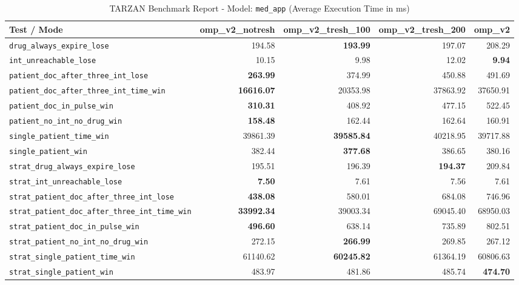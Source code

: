 \begin{table}[htbp]
\centering
\caption{TARZAN Benchmark Report - Model: \texttt{med\_app} (Average Execution Time in ms)}
\label{tab:med_app_benchmark}
\begin{tabular}{lrrrr}
\toprule
\textbf{Test / Mode} & \textbf{omp\_v2\_notresh} & \textbf{omp\_v2\_tresh\_100} & \textbf{omp\_v2\_tresh\_200} & \textbf{omp\_v2} \\
\midrule
\texttt{drug\_always\_expire\_lose} & 194.58 & \textbf{193.99} & 197.07 & 208.29 \\
\texttt{int\_unreachable\_lose} & 10.15 & 9.98 & 12.02 & \textbf{9.94} \\
\texttt{patient\_doc\_after\_three\_int\_lose} & \textbf{263.99} & 374.99 & 450.88 & 491.69 \\
\texttt{patient\_doc\_after\_three\_int\_time\_win} & \textbf{16616.07} & 20353.98 & 37863.92 & 37650.91 \\
\texttt{patient\_doc\_in\_pulse\_win} & \textbf{310.31} & 408.92 & 477.15 & 522.45 \\
\texttt{patient\_no\_int\_no\_drug\_win} & \textbf{158.48} & 162.44 & 162.64 & 160.91 \\
\texttt{single\_patient\_time\_win} & 39861.39 & \textbf{39585.84} & 40218.95 & 39717.88 \\
\texttt{single\_patient\_win} & 382.44 & \textbf{377.68} & 386.65 & 380.16 \\
\texttt{strat\_drug\_always\_expire\_lose} & 195.51 & 196.39 & \textbf{194.37} & 209.84 \\
\texttt{strat\_int\_unreachable\_lose} & \textbf{7.50} & 7.61 & 7.56 & 7.61 \\
\texttt{strat\_patient\_doc\_after\_three\_int\_lose} & \textbf{438.08} & 580.01 & 684.08 & 746.96 \\
\texttt{strat\_patient\_doc\_after\_three\_int\_time\_win} & \textbf{33992.34} & 39003.34 & 69045.40 & 68950.03 \\
\texttt{strat\_patient\_doc\_in\_pulse\_win} & \textbf{496.60} & 638.14 & 735.89 & 802.51 \\
\texttt{strat\_patient\_no\_int\_no\_drug\_win} & 272.15 & \textbf{266.99} & 269.85 & 267.12 \\
\texttt{strat\_single\_patient\_time\_win} & 61140.62 & \textbf{60245.82} & 61364.19 & 60806.63 \\
\texttt{strat\_single\_patient\_win} & 483.97 & 481.86 & 485.74 & \textbf{474.70} \\
\bottomrule
\end{tabular}
\end{table}